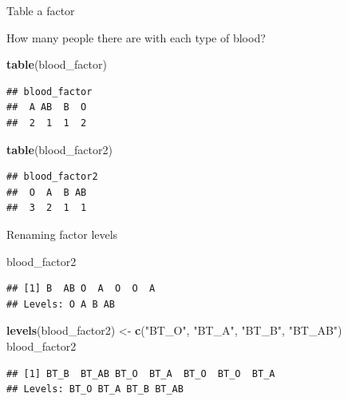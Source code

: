 \documentclass[ignorenonframetext,]{beamer}
\newenvironment{Shaded}{\begin{snugshade}}{\end{snugshade}}
\newcommand{\KeywordTok}[1]{\textcolor[rgb]{0.13,0.29,0.53}{\textbf{#1}}}
\newcommand{\NormalTok}[1]{#1}
\newcommand{\StringTok}[1]{\textcolor[rgb]{0.31,0.60,0.02}{#1}}
\begin{document}
\begin{frame}[fragile]{Table a factor}
\protect\hypertarget{table-a-factor}{}

How many people there are with each type of blood?

\begin{Shaded}
\begin{Highlighting}[]
\KeywordTok{table}\NormalTok{(blood_factor)}
\end{Highlighting}
\end{Shaded}

\begin{verbatim}
## blood_factor
##  A AB  B  O 
##  2  1  1  2
\end{verbatim}

\begin{Shaded}
\begin{Highlighting}[]
\KeywordTok{table}\NormalTok{(blood_factor2)}
\end{Highlighting}
\end{Shaded}

\begin{verbatim}
## blood_factor2
##  O  A  B AB 
##  3  2  1  1
\end{verbatim}

\end{frame}

\begin{frame}[fragile]{Renaming factor levels}
\protect\hypertarget{renaming-factor-levels}{}

\begin{Shaded}
\begin{Highlighting}[]
\NormalTok{blood_factor2 }
\end{Highlighting}
\end{Shaded}

\begin{verbatim}
## [1] B  AB O  A  O  O  A 
## Levels: O A B AB
\end{verbatim}

\begin{Shaded}
\begin{Highlighting}[]
\KeywordTok{levels}\NormalTok{(blood_factor2) <-}\StringTok{ }\KeywordTok{c}\NormalTok{(}\StringTok{"BT_O"}\NormalTok{, }\StringTok{"BT_A"}\NormalTok{, }\StringTok{"BT_B"}\NormalTok{,}
                           \StringTok{"BT_AB"}\NormalTok{)}
\NormalTok{blood_factor2}
\end{Highlighting}
\end{Shaded}

\begin{verbatim}
## [1] BT_B  BT_AB BT_O  BT_A  BT_O  BT_O  BT_A 
## Levels: BT_O BT_A BT_B BT_AB
\end{verbatim}

\end{frame}
\end{document}
